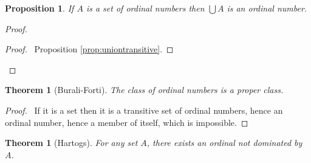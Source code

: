 \documentclass{book}
\let\qed\relax
\newtheorem{prop}[ax]{Proposition}
\newtheorem{thm}[ax]{Theorem}
\theoremstyle{definition}
\begin{document}
\begin{prop}
If $A$ is a set of ordinal numbers then $\bigcup A$ is an ordinal number.
\end{prop}

\begin{proof}
\pf
{}
\begin{proof}
	\pf\ Proposition \ref{prop:uniontransitive}.
\end{proof}
\qed
\end{proof}

\begin{thm}[Burali-Forti]
The class of ordinal numbers is a proper class.
\end{thm}

\begin{proof}
\pf\ If it is a set then it is a transitive set of ordinal numbers, hence an ordinal number, hence a member of itself, which is impossible. \qed
\end{proof}

\begin{thm}[Hartogs]
For any set $A$, there exists an ordinal not dominated by $A$.
\end{thm}
\end{document}
